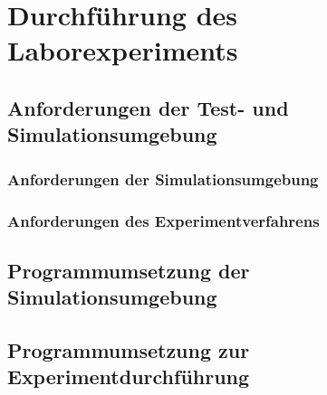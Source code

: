 \chapter{Durchführung des Laborexperiments}

\section{Anforderungen der Test- und Simulationsumgebung}
\subsection{Anforderungen der Simulationsumgebung}
\subsection{Anforderungen des Experimentverfahrens}
\section{Programmumsetzung der Simulationsumgebung}
\section{Programmumsetzung zur Experimentdurchführung}